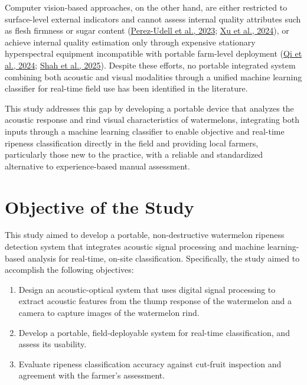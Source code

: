 \begin{thesisprose}
Computer vision-based approaches, on the other hand, are either restricted to surface-level external indicators and cannot assess internal quality attributes such as flesh firmness or sugar content (\hyperlink{cite.perezudell2023}{Perez-Udell et al., 2023}; \hyperlink{cite.xu2024}{Xu et al., 2024}), or achieve internal quality estimation only through expensive stationary hyperspectral equipment incompatible with portable farm-level deployment (\hyperlink{cite.qi2024}{Qi et al., 2024}; \hyperlink{cite.shah2025}{Shah et al., 2025}). Despite these efforts, no portable integrated system combining both acoustic and visual modalities through a unified machine learning classifier for real-time field use has been identified in the literature.

This study addresses this gap by developing a portable device that analyzes the acoustic response and rind visual characteristics of watermelons, integrating both inputs through a machine learning classifier to enable objective and real-time ripeness classification directly in the field and providing local farmers, particularly those new to the practice, with a reliable and standardized alternative to experience-based manual assessment.

\section{Objective of the Study}

This study aimed to develop a portable, non-destructive watermelon ripeness detection system that integrates acoustic signal processing and machine learning-based analysis for real-time, on-site classification. Specifically, the study aimed to accomplish the following objectives:

\begin{enumerate}

\item Design an acoustic-optical system that uses digital signal processing to extract acoustic features from the thump response of the watermelon and a camera to capture images of the watermelon rind.

\item Develop a portable, field-deployable system for real-time classification, and assess its usability. 

\item Evaluate ripeness classification accuracy against cut-fruit inspection and agreement with the farmer's assessment.

\end{enumerate}


\end{thesisprose}
